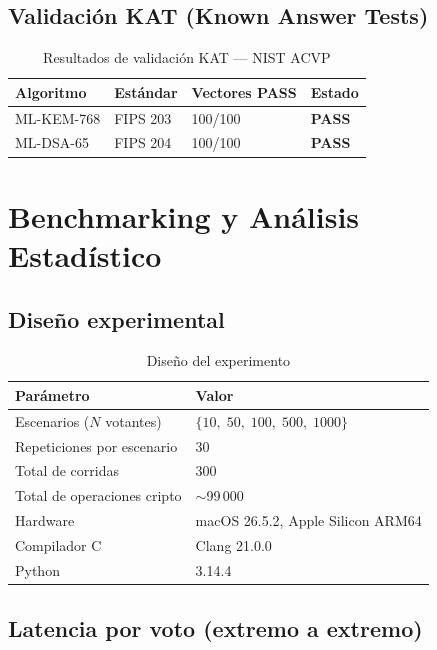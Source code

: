 \documentclass[12pt,a4paper,twoside,openright]{book}
\theoremstyle{plain}
\theoremstyle{definition}
\theoremstyle{remark}
\begin{document}
\section{Validaci\'on KAT (Known Answer Tests)}

\begin{table}[H]
\centering
\caption{Resultados de validaci\'on KAT --- NIST ACVP}
\label{tab:kat}
\begin{tabular}{llll}
\toprule
\textbf{Algoritmo} & \textbf{Est\'andar} & \textbf{Vectores PASS} & \textbf{Estado} \\
\midrule
ML-KEM-768 & FIPS 203 & 100/100 & \textbf{PASS} \\
ML-DSA-65  & FIPS 204 & 100/100 & \textbf{PASS} \\
\bottomrule
\end{tabular}
\end{table}

\chapter{Benchmarking y An\'alisis Estad\'istico}
\label{chap:benchmarks}

\section{Dise\~no experimental}

\begin{table}[H]
\centering
\caption{Dise\~no del experimento}
\label{tab:diseno}
\begin{tabular}{ll}
\toprule
\textbf{Par\'ametro} & \textbf{Valor} \\
\midrule
Escenarios ($N$ votantes) & $\{10,\; 50,\; 100,\; 500,\; 1000\}$ \\
Repeticiones por escenario & 30 \\
Total de corridas & 300 \\
Total de operaciones cripto & $\sim$99\,000 \\
Hardware & macOS 26.5.2, Apple Silicon ARM64 \\
Compilador C & Clang 21.0.0 \\
Python & 3.14.4 \\
\bottomrule
\end{tabular}
\end{table}

\section{Latencia por voto (extremo a extremo)}
\end{document}

